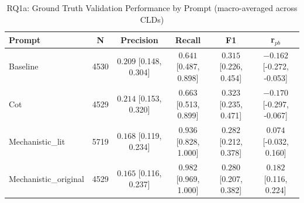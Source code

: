 \begin{table}[htbp]
\centering
\caption{RQ1a: Ground Truth Validation Performance by Prompt (macro-averaged across CLDs)}
\label{tab:rq1a_gt_by_prompt}
\begin{tabular}{lccccc}
\toprule
\textbf{Prompt} & \textbf{N} & \textbf{Precision} & \textbf{Recall} & \textbf{F1} & \textbf{r$_{pb}$} \\
\midrule
Baseline & 4530 & $0.209$ [0.148, 0.304] & $0.641$ [0.487, 0.898] & $0.315$ [0.226, 0.454] & $-0.162$ [-0.272, -0.053] \\
Cot & 4529 & $0.214$ [0.153, 0.320] & $0.663$ [0.513, 0.899] & $0.323$ [0.235, 0.471] & $-0.170$ [-0.297, -0.067] \\
Mechanistic_lit & 5719 & $0.168$ [0.119, 0.234] & $0.936$ [0.828, 1.000] & $0.282$ [0.212, 0.378] & $0.074$ [-0.032, 0.160] \\
Mechanistic_original & 4529 & $0.165$ [0.116, 0.237] & $0.982$ [0.969, 1.000] & $0.280$ [0.207, 0.382] & $0.182$ [0.116, 0.224] \\
\bottomrule
\end{tabular}
\end{table}